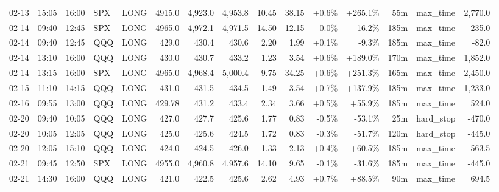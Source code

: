 \documentclass[11pt,a4paper,twoside]{article}
\begin{document}
\begin{landscape}
\begin{center}
\begin{longtable}{>{\color{txtmain}}l l l l l r r r r r r r r >{\color{txtmain}}l r}
02-13 & 15:05 & 16:00 & SPX & LONG & 4915.0 & 4,923.0 & 4,953.8 & 10.45 & 38.15 & \textcolor{wingreen}{+0.6\%} & \textcolor{wingreen}{+265.1\%} & 55m & max\_time & \textcolor{wingreen}{2,770.0} \\
02-14 & 09:40 & 12:45 & SPX & LONG & 4965.0 & 4,972.1 & 4,971.5 & 14.50 & 12.15 & \textcolor{lossred}{-0.0\%} & \textcolor{lossred}{-16.2\%} & 185m & max\_time & \textcolor{lossred}{-235.0} \\
02-14 & 09:40 & 12:45 & QQQ & LONG & 429.0 & 430.4 & 430.6 & 2.20 & 1.99 & \textcolor{wingreen}{+0.1\%} & \textcolor{lossred}{-9.3\%} & 185m & max\_time & \textcolor{lossred}{-82.0} \\
02-14 & 13:10 & 16:00 & QQQ & LONG & 430.0 & 430.7 & 433.2 & 1.23 & 3.54 & \textcolor{wingreen}{+0.6\%} & \textcolor{wingreen}{+189.0\%} & 170m & max\_time & \textcolor{wingreen}{1,852.0} \\
02-14 & 13:15 & 16:00 & SPX & LONG & 4965.0 & 4,968.4 & 5,000.4 & 9.75 & 34.25 & \textcolor{wingreen}{+0.6\%} & \textcolor{wingreen}{+251.3\%} & 165m & max\_time & \textcolor{wingreen}{2,450.0} \\
02-15 & 11:10 & 14:15 & QQQ & LONG & 431.0 & 431.5 & 434.5 & 1.49 & 3.54 & \textcolor{wingreen}{+0.7\%} & \textcolor{wingreen}{+137.9\%} & 185m & max\_time & \textcolor{wingreen}{1,233.0} \\
02-16 & 09:55 & 13:00 & QQQ & LONG & 429.78 & 431.2 & 433.4 & 2.34 & 3.66 & \textcolor{wingreen}{+0.5\%} & \textcolor{wingreen}{+55.9\%} & 185m & max\_time & \textcolor{wingreen}{524.0} \\
02-20 & 09:40 & 10:05 & QQQ & LONG & 427.0 & 427.7 & 425.6 & 1.77 & 0.83 & \textcolor{lossred}{-0.5\%} & \textcolor{lossred}{-53.1\%} & 25m & hard\_stop & \textcolor{lossred}{-470.0} \\
02-20 & 10:05 & 12:05 & QQQ & LONG & 425.0 & 425.6 & 424.5 & 1.72 & 0.83 & \textcolor{lossred}{-0.3\%} & \textcolor{lossred}{-51.7\%} & 120m & hard\_stop & \textcolor{lossred}{-445.0} \\
02-20 & 12:05 & 15:10 & QQQ & LONG & 424.0 & 424.5 & 426.0 & 1.33 & 2.13 & \textcolor{wingreen}{+0.4\%} & \textcolor{wingreen}{+60.5\%} & 185m & max\_time & \textcolor{wingreen}{563.5} \\
02-21 & 09:45 & 12:50 & SPX & LONG & 4955.0 & 4,960.8 & 4,957.6 & 14.10 & 9.65 & \textcolor{lossred}{-0.1\%} & \textcolor{lossred}{-31.6\%} & 185m & max\_time & \textcolor{lossred}{-445.0} \\
02-21 & 14:30 & 16:00 & QQQ & LONG & 421.0 & 422.5 & 425.6 & 2.62 & 4.93 & \textcolor{wingreen}{+0.7\%} & \textcolor{wingreen}{+88.5\%} & 90m & max\_time & \textcolor{wingreen}{694.5} \\

\end{longtable}
\end{center}
\end{landscape}
\end{document}
